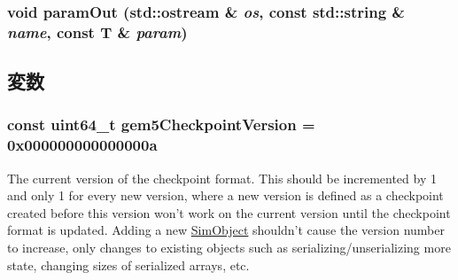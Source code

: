 \label{serialize_8hh_ac6aea34b594f3d7c3e69d650e2d8e37b}
\hypertarget{serialize_8hh_a01d1211675b41352b29c775179e15f2a}{
\subsubsection[{paramOut}]{\setlength{\rightskip}{0pt plus 5cm}void paramOut (std::ostream \& {\em os}, \/  const std::string \& {\em name}, \/  const T \& {\em param})}}
\label{serialize_8hh_a01d1211675b41352b29c775179e15f2a}


\subsection{変数}
\hypertarget{serialize_8hh_a12e740c0c33a4a5fc432413005beae4c}{
\subsubsection[{gem5CheckpointVersion}]{\setlength{\rightskip}{0pt plus 5cm}const uint64\_\-t {\bf gem5CheckpointVersion} = 0x000000000000000a}}
\label{serialize_8hh_a12e740c0c33a4a5fc432413005beae4c}
The current version of the checkpoint format. This should be incremented by 1 and only 1 for every new version, where a new version is defined as a checkpoint created before this version won't work on the current version until the checkpoint format is updated. Adding a new \hyperlink{classSimObject}{SimObject} shouldn't cause the version number to increase, only changes to existing objects such as serializing/unserializing more state, changing sizes of serialized arrays, etc. 